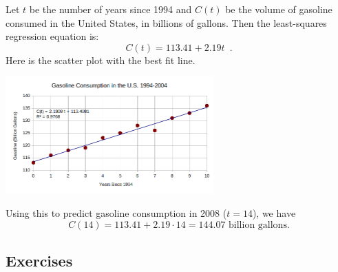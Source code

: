 \begin{example}
\begin{solution}
Let $t$ be the number of years since 1994 and $C(t)$ be the volume of gasoline consumed in the United States, in billions of gallons. Then the least-squares regression equation is:
$$C(t) = 113.41 + 2.19t \enspace .$$
Here is the scatter plot with the best fit line.
\begin{center}
  \includegraphics[width=0.6\textwidth]{img/chap1/sec1-4/gas-line.png}
\end{center}

Using this to predict gasoline consumption in 2008 ($t = 14$), we have
$$C(14) = 113.41 + 2.19\cdot 14 = 144.07 \mbox{ billion gallons.}$$


\end{solution}\end{example}

%
%
%
%
%
%
%
%
%
%
%
%
%
%
%

\subsection{Exercises}
\label{1-4-exercises}

%


